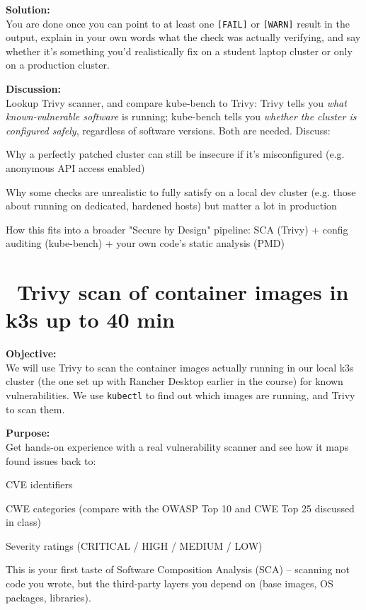 \documentclass[a4paper,11pt,notitlepage]{report}
\begin{document}
{\bf Solution:}\\
You are done once you can point to at least one \verb+[FAIL]+ or \verb+[WARN]+ result in the output, explain in your own words what the check was actually verifying, and say whether it's something you'd realistically fix on a student laptop cluster or only on a production cluster.

{\bf Discussion:}\\
Lookup Trivy scanner, and compare kube-bench to Trivy: Trivy tells you \emph{what known-vulnerable software} is running; kube-bench tells you \emph{whether the cluster is configured safely}, regardless of software versions. Both are needed. Discuss:
\begin{list2}
  \item Why a perfectly patched cluster can still be insecure if it's misconfigured (e.g. anonymous API access enabled)
  \item Why some checks are unrealistic to fully satisfy on a local dev cluster (e.g. those about running on dedicated, hardened hosts) but matter a lot in production
  \item How this fits into a broader "Secure by Design" pipeline: SCA (Trivy) + config auditing (kube-bench) + your own code's static analysis (PMD)
\end{list2}


\chapter{\faInfoCircle\ Trivy scan of container images in k3s up to 40 min}
\label{ex:sw-trivy-k3s}
{\bf Objective:}\\
We will use Trivy to scan the container images actually running in our local k3s cluster (the one set up with Rancher Desktop earlier in the course) for known vulnerabilities. We use \verb+kubectl+ to find out which images are running, and Trivy to scan them.

{\bf Purpose:}\\
Get hands-on experience with a real vulnerability scanner and see how it maps found issues back to:
\begin{list2}
  \item CVE identifiers
  \item CWE categories (compare with the OWASP Top 10 and CWE Top 25 discussed in class)
  \item Severity ratings (CRITICAL / HIGH / MEDIUM / LOW)
\end{list2}
This is your first taste of Software Composition Analysis (SCA) -- scanning not code you wrote, but the third-party layers you depend on (base images, OS packages, libraries).
\end{document}
